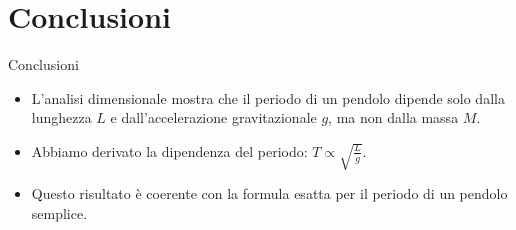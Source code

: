 \documentclass{beamer}
\begin{document}
\section{Conclusioni}

\begin{frame}{Conclusioni}
    \begin{itemize}
        \item L'analisi dimensionale mostra che il periodo di un pendolo dipende solo dalla lunghezza $ L $ e dall'accelerazione gravitazionale $ g $, ma non dalla massa $ M $.
        \item Abbiamo derivato la dipendenza del periodo: $ T \propto \sqrt{\frac{L}{g}} $.
        \item Questo risultato è coerente con la formula esatta per il periodo di un pendolo semplice.
    \end{itemize}
\end{frame}
\end{document}
